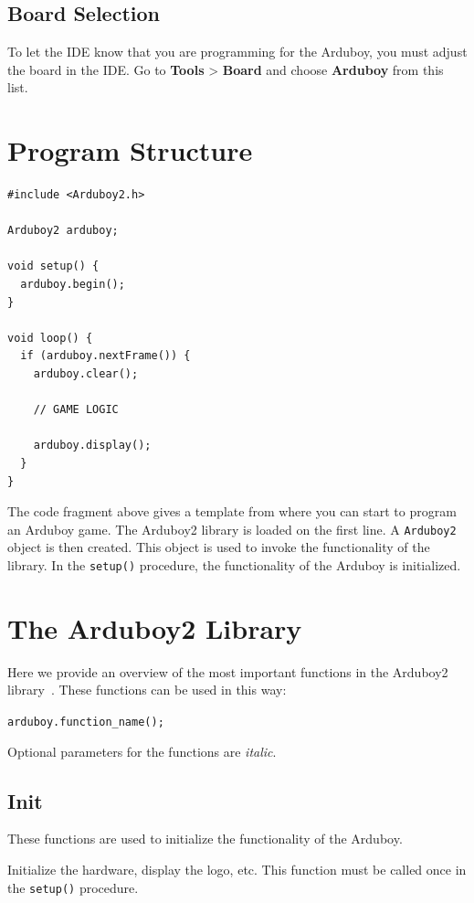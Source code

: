 \documentclass[11pt,fleqn]{book} %
\begin{document}
\subsection{Board Selection}
To let the IDE know that you are programming for the Arduboy, you must adjust the board in the IDE. Go to \textbf{Tools} > \textbf{Board} and choose \textbf{Arduboy} from this list.

\section{Program Structure}

\begin{verbatim}
#include <Arduboy2.h>

Arduboy2 arduboy;

void setup() {
  arduboy.begin();
}

void loop() {
  if (arduboy.nextFrame()) {
    arduboy.clear();

    // GAME LOGIC

    arduboy.display();
  }
}
\end{verbatim}
\noindent
The code fragment above gives a template from where you can start to program an Arduboy game. The Arduboy2 library is loaded on the first line. A \texttt{Arduboy2} object is then created. This object is used to invoke the functionality of the library. In the \texttt{setup()} procedure, the functionality of the Arduboy is initialized.

\section{The Arduboy2 Library}
Here we provide an overview of the most important functions in the Arduboy2 library~\cite{arduboy:lib2-doc}. These functions can be used in this way:

\begin{center}
	\texttt{arduboy.function_name();}
\end{center}
\noindent
Optional parameters for the functions are \emph{italic}.

\subsection{Init}
These functions are used to initialize the functionality of the Arduboy.

\begin{libf}[begin()]
	Initialize the hardware, display the logo, etc. This function must be called once in the \texttt{setup()} procedure.
\end{libf}
\end{document}
